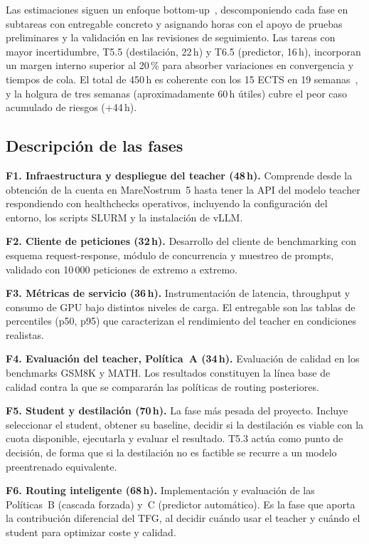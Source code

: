 \documentclass[11pt,a4paper]{article}
\begin{document}
Las estimaciones siguen un enfoque bottom-up~\cite{mcconnell06}, descomponiendo cada fase en subtareas con entregable concreto y asignando horas con el apoyo de pruebas preliminares y la validación en las revisiones de seguimiento. Las tareas con mayor incertidumbre, T5.5 (destilación, 22\,h) y T6.5 (predictor, 16\,h), incorporan un margen interno superior al 20\,\% para absorber variaciones en convergencia y tiempos de cola. El total de 450\,h es coherente con los 15 ECTS en 19 semanas~\cite{gep23}, y la holgura de tres semanas (aproximadamente 60\,h útiles) cubre el peor caso acumulado de riesgos (+44\,h).

\subsection{Descripción de las fases}

\textbf{F1. Infraestructura y despliegue del teacher (48\,h).} Comprende desde la obtención de la cuenta en MareNostrum~5 hasta tener la API del modelo teacher respondiendo con healthchecks operativos, incluyendo la configuración del entorno, los scripts SLURM y la instalación de vLLM.

\textbf{F2. Cliente de peticiones (32\,h).} Desarrollo del cliente de benchmarking con esquema request-response, módulo de concurrencia y muestreo de prompts, validado con 10\,000 peticiones de extremo a extremo.

\textbf{F3. Métricas de servicio (36\,h).} Instrumentación de latencia, throughput y consumo de GPU bajo distintos niveles de carga. El entregable son las tablas de percentiles (p50, p95) que caracterizan el rendimiento del teacher en condiciones realistas.

\textbf{F4. Evaluación del teacher, Política~A (34\,h).} Evaluación de calidad en los benchmarks GSM8K y MATH. Los resultados constituyen la línea base de calidad contra la que se compararán las políticas de routing posteriores.

\textbf{F5. Student y destilación (70\,h).} La fase más pesada del proyecto. Incluye seleccionar el student, obtener su baseline, decidir si la destilación es viable con la cuota disponible, ejecutarla y evaluar el resultado. T5.3 actúa como punto de decisión, de forma que si la destilación no es factible se recurre a un modelo preentrenado equivalente.

\textbf{F6. Routing inteligente (68\,h).} Implementación y evaluación de las Políticas~B (cascada forzada) y~C (predictor automático). Es la fase que aporta la contribución diferencial del TFG, al decidir cuándo usar el teacher y cuándo el student para optimizar coste y calidad.
\end{document}
